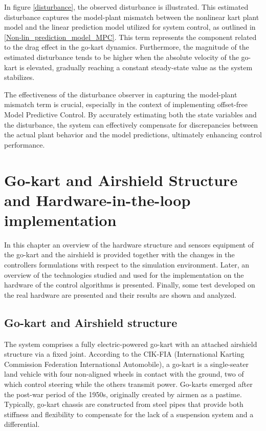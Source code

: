\documentclass[a4paper,12pt,oneside]{book}
\begin{document}
In figure \ref{disturbance}, the observed disturbance is illustrated. 
This estimated disturbance captures the model-plant mismatch between the nonlinear kart plant model and the linear prediction model utilized for system control, as outlined in \eqref{Non-lin_prediction_model_MPC}.
This term represents the component related to the drag effect in the go-kart dynamics.
Furthermore, the magnitude of the estimated disturbance tends to be higher when the absolute velocity of the go-kart is elevated, gradually reaching a constant steady-state value as the system stabilizes.

The effectiveness of the disturbance observer in capturing the model-plant mismatch term is crucial, especially in the context of implementing offset-free Model Predictive Control. 
By accurately estimating both the state variables and the disturbance, the system can effectively compensate for discrepancies between the actual plant behavior and the model predictions, ultimately enhancing control performance.

 \chapter{Go-kart and Airshield Structure and Hardware-in-the-loop implementation}
In this chapter an overview of the hardware structure and sensors equipment of the go-kart and the airshield is provided together with the changes in the controllers formulations with respect to the simulation environment. 
Later, an overview of the technologies studied and used for the implementation on the hardware of the control algorithms is presented.
Finally, some test developed on the real hardware are presented and their results are shown and analyzed.

\section{Go-kart and Airshield structure}

The system comprises a fully electric-powered go-kart with an attached airshield structure via a fixed joint. 
According to the CIK-FIA (International Karting Commission Federation International Automobile), a go-kart is a single-seater land vehicle with four non-aligned wheels in contact with the ground, two of which control steering while the others transmit power. 
Go-karts emerged after the post-war period of the 1950s, originally created by airmen as a pastime.
Typically, go-kart chassis are constructed from steel pipes that provide both stiffness and flexibility to compensate for the lack of a suspension system and a differential.
\end{document}
